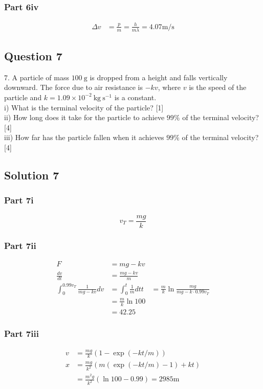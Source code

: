 \documentclass{article}
\begin{document}
\subsubsection{Part 6iv}
\begin{align}
    \Delta v &= \frac{p}{m} = \frac{h}{m\lambda} = 4.07 \mathrm{m/s}
\end{align}
\subsection{Question 7}
7. A particle of mass $100 \mathrm{~g}$ is dropped from a height and falls vertically downward. The force due to air resistance is $-k v$, where $v$ is the speed of the particle and $k=1.09 \times 10^{-2} \mathrm{~kg} \mathrm{~s}^{-1}$ is a constant. \\
i) What is the terminal velocity of the particle? [1] \\
ii) How long does it take for the particle to achieve $99 \%$ of the terminal velocity? [4] \\
iii) How far has the particle fallen when it achieves $99 \%$ of the terminal velocity? [4]

\subsection{Solution 7}
\subsubsection{Part 7i}
\[v_T = \frac{mg}{k}\]
\subsubsection{Part 7ii}
\begin{align}
    F &= mg-kv \\
    \frac{dv}{dt} &= \frac{mg-kv}{m} \\
    \int_0^{0.99 v_T} \frac{1}{mg-kv} dv &= \int_0^t \frac{1}{m} dt
    t &= \frac{m}{k} \ln \frac{mg}{mg-k\cdot 0.99v_T} \\
    &= \frac{m}{k} \ln 100 \\
    &= 42.25
\end{align}
\subsubsection{Part 7iii}
\begin{align}
    v &= \frac{mg}{k} (1-\exp(-kt/m)) \\
    x &= \frac{mg}{k^2} (m(\exp(-kt/m)-1) + kt) \\
    &= \frac{m^2g}{k^2} (\ln 100 - 0.99) = 2985 \mathrm{m}
\end{align}
\end{document}

